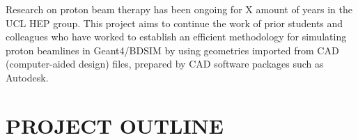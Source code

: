 \documentclass[a4paper, 12pt, conference]
{ieeeconf}      %
\begin{document}
Research on proton beam therapy has been ongoing for X amount of years in the UCL HEP group. This project aims to continue the work of prior students and colleagues who have worked to establish an efficient methodology for simulating proton beamlines in Geant4/BDSIM by using geometries imported from CAD (computer-aided design) files, prepared by CAD software packages such as Autodesk.







\section{PROJECT OUTLINE}


\newpage



\addtolength{\textheight}{-12cm}   %

















\end{document}
